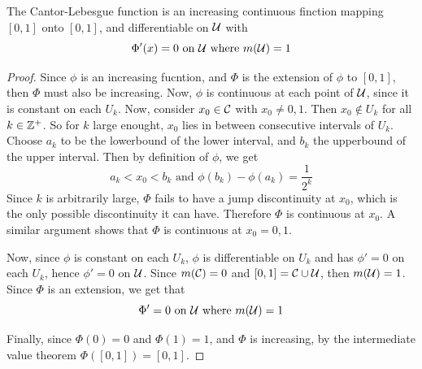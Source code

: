 \begin{theorem}\label{theorem_1.5.2}
    The Cantor-Lebesgue function is an increasing continuous finction mapping
    $[0,1]$ onto $[0,1]$, and differentiable on $\mathcal{U}$ with
    \begin{equation*}
        \Phi'(x)=0 \text{ on } \mathcal{U} \text{ where } m(\mathcal{U})=1
    \end{equation*}
\end{theorem}
\begin{proof}
    Since $\phi$ is an increasing fucntion, and  $\Phi$ is the extension of
    $\phi$ to  $[0,1]$, then $\Phi$ must also be increasing. Now,  $\phi$ is
    continuous at each point of  $\mathcal{U}$, since it is constant on each  $U_k$.
    Now, consider  $x_0 \in \mathcal{C}$ with $x_0 \neq 0,1$. Then $x_0 \notin U_k$ for
    all $k \in \mathbb{Z}^+$. So for  $k$ large enought,  $x_0$ lies in between
    consecutive intervals of $U_k$. Choose  $a_k$ to be the lowerbound of the
    lower interval, and  $b_k$ the upperbound of the upper interval. Then by
    definition of  $\phi$, we get
    \begin{equation*}
        a_k<x_0<b_k \text{ and } \phi(b_k)-\phi(a_k)=\frac{1}{2^k}
    \end{equation*}
    Since $k$ is arbitrarily large, $\Phi$ fails to have a jump discontinuity at
     $x_0$, which is the only possible discontinuity it can have. Therefore
     $\Phi$ is continuous at  $x_0$. A similar argument shows that $\Phi$ is
     continuous at $x_0=0,1$.

     Now, since $\phi$ is constant on each  $U_k$,  $\phi$ is differentiable on
      $U_k$ and has  $\phi'=0$ on each  $U_k$, hence  $\phi'=0$ on $\mathcal{U}$. Since
      $m(\mathcal{C})=0$ and $[0,1]=\mathcal{C} \cup \mathcal{U}$, then $m(\mathcal{U})=1$. Since $\Phi$ is an
      extension, we get that
      \begin{equation*}
          \Phi'=0 \text{ on } \mathcal{U} \text{ where } m(\mathcal{U})=1
      \end{equation*}

      Finally, since $\Phi(0)=0$ and $\Phi(1)=1$, and $\Phi$ is increasing, by
      the intermediate value theorem $\Phi([0,1])=[0,1]$.
\end{proof}

